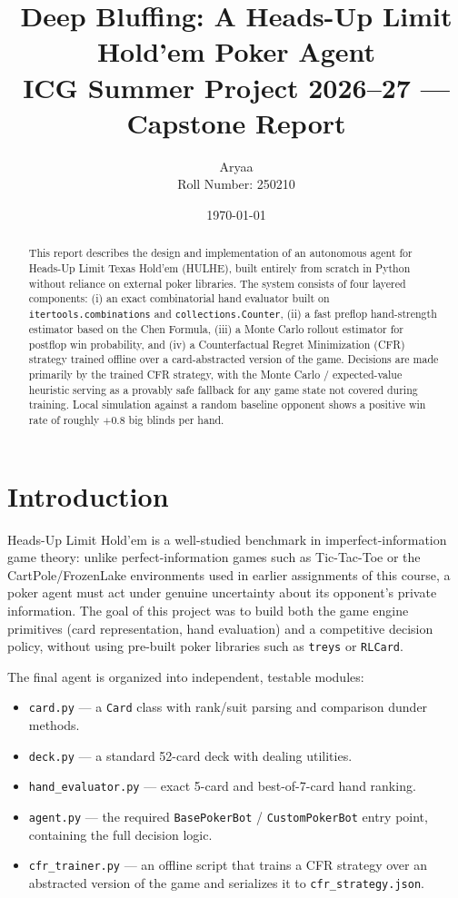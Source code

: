 \documentclass[11pt]{article}
\title{\textbf{Deep Bluffing: A Heads-Up Limit Hold'em Poker Agent} \\
\large ICG Summer Project 2026--27 --- Capstone Report}
\author{Aryaa \\ Roll Number: 250210 }
\date{\today}
\begin{document}
\maketitle

\begin{abstract}
This report describes the design and implementation of an autonomous agent for
Heads-Up Limit Texas Hold'em (HULHE), built entirely from scratch in Python
without reliance on external poker libraries. The system consists of four
layered components: (i) an exact combinatorial hand evaluator built on
\texttt{itertools.combinations} and \texttt{collections.Counter}, (ii) a fast
preflop hand-strength estimator based on the Chen Formula, (iii) a Monte
Carlo rollout estimator for postflop win probability, and (iv) a
Counterfactual Regret Minimization (CFR) strategy trained offline over a
card-abstracted version of the game. Decisions are made primarily by the
trained CFR strategy, with the Monte Carlo / expected-value heuristic serving
as a provably safe fallback for any game state not covered during training.
Local simulation against a random baseline opponent shows a positive
win rate of roughly $+0.8$ big blinds per hand.
\end{abstract}

\tableofcontents

\section{Introduction}

Heads-Up Limit Hold'em is a well-studied benchmark in imperfect-information
game theory: unlike perfect-information games such as Tic-Tac-Toe or the
CartPole/FrozenLake environments used in earlier assignments of this course,
a poker agent must act under genuine uncertainty about its opponent's private
information. The goal of this project was to build both the game engine
primitives (card representation, hand evaluation) and a competitive decision
policy, without using pre-built poker libraries such as \texttt{treys} or
\texttt{RLCard}.

The final agent is organized into independent, testable modules:

\begin{itemize}
    \item \texttt{card.py} --- a \texttt{Card} class with rank/suit parsing and
    comparison dunder methods.
    \item \texttt{deck.py} --- a standard 52-card deck with dealing utilities.
    \item \texttt{hand\_evaluator.py} --- exact 5-card and best-of-7-card hand
    ranking.
    \item \texttt{agent.py} --- the required \texttt{BasePokerBot} /
    \texttt{CustomPokerBot} entry point, containing the full decision logic.
    \item \texttt{cfr\_trainer.py} --- an offline script that trains a CFR
    strategy over an abstracted version of the game and serializes it to
    \texttt{cfr\_strategy.json}.
\end{itemize}
\end{document}
